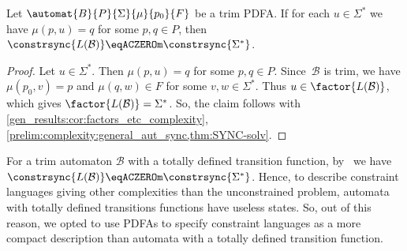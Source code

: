 \begin{corollary}
	Let $\automat{B}{P}{\Sigma}{\mu}{p_0}{F}$ be a trim PDFA.
    If for each $u\in \Sigma^*$ we have $\mu(p, u) = q$ for some $p,q \in P$,
    then  $\constrsync{L(\mathcal B)} \eqACZEROm \constrsync{\Sigma^*}$.
\end{corollary}
\begin{proof}
	Let $u \in \Sigma^*$. Then  $\mu(p, u) = q$ for some $p,q \in P$.
	Since~$\mathcal B$ is trim,
	we have $\mu(p_0, v) = p$
	and $\mu(q, w) \in F$ for some $v,w \in \Sigma^*$.
	Thus $u \in \factor{L(\mathcal B)}$,
	which gives $\factor{L(\mathcal B)} = \Sigma^*$.
	So, the claim follows
	with \cref{gen_results:cor:factors_etc_complexity}, 
	\cref{prelim:complexity:general_aut_sync,thm:SYNC-solv}.	
\end{proof}

\begin{remark}\label{rem:PDFA-for-constraint}
	For a trim automaton $\mathcal B$ with a totally defined transition function,
	by~
	we have $\constrsync{L(\mathcal B)} \eqACZEROm \constrsync{\Sigma^*}$.
	Hence, to describe constraint languages giving other complexities than the unconstrained problem,
	automata with totally defined transitions functions have useless states.
	So, out of this reason, we opted to use PDFAs to specify constraint languages
	as a more compact description than automata 
	with a totally defined transition function.
\end{remark}